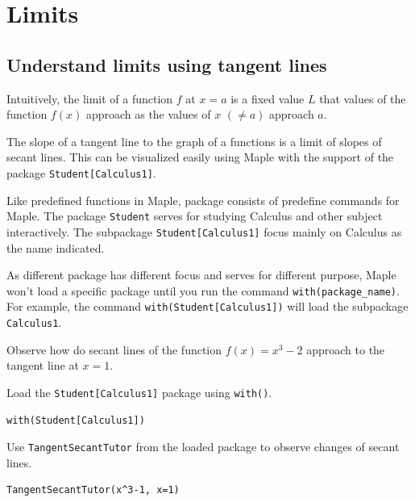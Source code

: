 \documentclass[]{book}
\theoremstyle{definition}
\theoremstyle{definition}
\theoremstyle{definition}
\theoremstyle{remark}
\let\BeginKnitrBlock\begin \let\EndKnitrBlock\end
\begin{document}
\hypertarget{limits}{%
\chapter{Limits}\label{limits}}

\hypertarget{understand-limits-using-tangent-lines}{%
\section{Understand limits using tangent lines}\label{understand-limits-using-tangent-lines}}

Intuitively, the limit of a function \(f\) at \(x=a\) is a fixed value \(L\) that values of the function \(f(x)\) approach as the values of \(x\) \((\ne a)\) approach \(a\).

The slope of a tangent line to the graph of a functions is a limit of slopes of secant lines. This can be visualized easily using Maple with the support of the package \texttt{Student{[}Calculus1{]}}.

Like predefined functions in Maple, package consists of predefine commands for Maple. The package \texttt{Student} serves for studying Calculus and other subject interactively. The subpackage \texttt{Student{[}Calculus1{]}} focus mainly on Calculus as the name indicated.

As different package has different focus and serves for different purpose, Maple won't load a specific package until you run the command \texttt{with(package\_name)}. For example, the command
\texttt{with(Student{[}Calculus1{]})} will load the subpackage \texttt{Calculus1}.

\BeginKnitrBlock{example}
\protect\hypertarget{exm:unnamed-chunk-1}{}{\label{exm:unnamed-chunk-1} }
Observe how do secant lines of the function \(f(x)=x^3-2\) approach to the tangent line at \(x=1\).
\EndKnitrBlock{example}

\BeginKnitrBlock{solution}
{}Load the \texttt{Student{[}Calculus1{]}} package using \texttt{with()}.

\begin{verbatim}
with(Student[Calculus1])
\end{verbatim}

Use \texttt{TangentSecantTutor} from the loaded package to observe changes of secant lines.

\begin{verbatim}
TangentSecantTutor(x^3-1, x=1)
\end{verbatim}
\EndKnitrBlock{solution}
\end{document}
